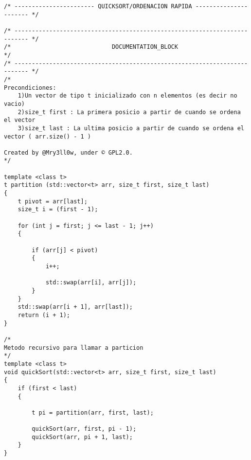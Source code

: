 \begin{lstlisting}
/* ----------------------- QUICKSORT/ORDENACION RAPIDA ---------------------- */

/* -------------------------------------------------------------------------- */
/*                             DOCUMENTATION_BLOCK                            */
/* -------------------------------------------------------------------------- */
/*
Precondiciones: 
    1)Un vector de tipo t inicializado con n elementos (es decir no vacio)
    2)size_t first : La primera posicio a partir de cuando se ordena el vector
    3)size_t last : La ultima posicio a partir de cuando se ordena el vector ( arr.size() - 1 )

Created by @Mry3ll0w, under © GPL2.0.
*/ 

template <class t>
t partition (std::vector<t> arr, size_t first, size_t last)  
{  
    t pivot = arr[last];  
    size_t i = (first - 1);  
  
    for (int j = first; j <= last - 1; j++)  
    {  
     
        if (arr[j] < pivot)  
        {  
            i++;  
    
            std::swap(arr[i], arr[j]);  
        }  
    }  
    std::swap(arr[i + 1], arr[last]);  
    return (i + 1);  
}  

/*
Metodo recursivo para llamar a particion
*/
template <class t>
void quickSort(std::vector<t> arr, size_t first, size_t last)  
{  
    if (first < last)  
    {  
        
        t pi = partition(arr, first, last);  
   
        quickSort(arr, first, pi - 1);  
        quickSort(arr, pi + 1, last);  
    }  
}

\end{lstlisting}